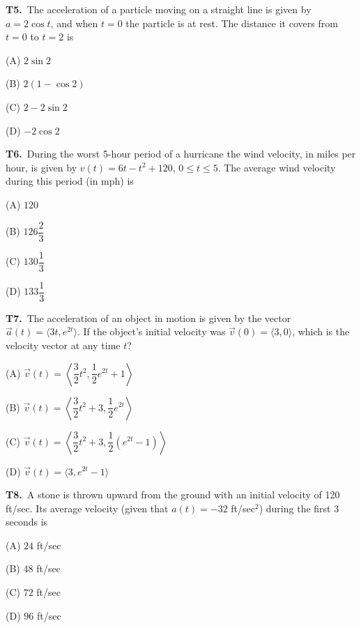 \documentclass[11pt]{article}
\begin{document}
\bigskip\noindent\textbf{T5.}\ The acceleration of a particle moving on a straight line is given by $a=2\cos t$, and when $t=0$ the particle is at rest. The distance it covers from $t=0$ to $t=2$ is
\begin{list}{}{\setlength{\leftmargin}{3em}\setlength{\labelwidth}{2.5em}\setlength{\itemsep}{0pt}\setlength{\topsep}{2pt}}
\item[(A)] $2\sin 2$
\item[(B)] $2(1-\cos 2)$
\item[(C)] $2-2\sin 2$
\item[(D)] $-2\cos 2$
\end{list}

\bigskip\noindent\textbf{T6.}\ During the worst 5-hour period of a hurricane the wind velocity, in miles per hour, is given by $v(t)=6t-t^2+120$, $0\leq t \leq 5$. The average wind velocity during this period (in mph) is
\begin{list}{}{\setlength{\leftmargin}{3em}\setlength{\labelwidth}{2.5em}\setlength{\itemsep}{0pt}\setlength{\topsep}{2pt}}
\item[(A)] $120$
\item[(B)] $126\dfrac{2}{3}$
\item[(C)] $130\dfrac{1}{3}$
\item[(D)] $133\dfrac{1}{3}$
\end{list}

\bigskip\noindent\textbf{T7.}\ The acceleration of an object in motion is given by the vector $\vec{a}(t)=\langle 3t, e^{2t}\rangle$. If the object's initial velocity was $\vec{v}(0)=\langle 3,0\rangle$, which is the velocity vector at any time $t$?
\begin{list}{}{\setlength{\leftmargin}{3em}\setlength{\labelwidth}{2.5em}\setlength{\itemsep}{0pt}\setlength{\topsep}{2pt}}
\item[(A)] $\vec{v}(t)=\left\langle \dfrac{3}{2}t^2, \dfrac{1}{2}e^{2t}+1\right\rangle$
\item[(B)] $\vec{v}(t)=\left\langle \dfrac{3}{2}t^2+3, \dfrac{1}{2}e^{2t}\right\rangle$
\item[(C)] $\vec{v}(t)=\left\langle \dfrac{3}{2}t^2+3, \dfrac{1}{2}(e^{2t}-1)\right\rangle$
\item[(D)] $\vec{v}(t)=\langle 3, e^{2t}-1\rangle$
\end{list}

\bigskip\noindent\textbf{T8.}\ A stone is thrown upward from the ground with an initial velocity of 120 ft/sec. Its average velocity (given that $a(t)=-32$ ft/sec$^2$) during the first 3 seconds is
\begin{list}{}{\setlength{\leftmargin}{3em}\setlength{\labelwidth}{2.5em}\setlength{\itemsep}{0pt}\setlength{\topsep}{2pt}}
\item[(A)] $24$ ft/sec
\item[(B)] $48$ ft/sec
\item[(C)] $72$ ft/sec
\item[(D)] $96$ ft/sec
\end{list}
\end{document}
